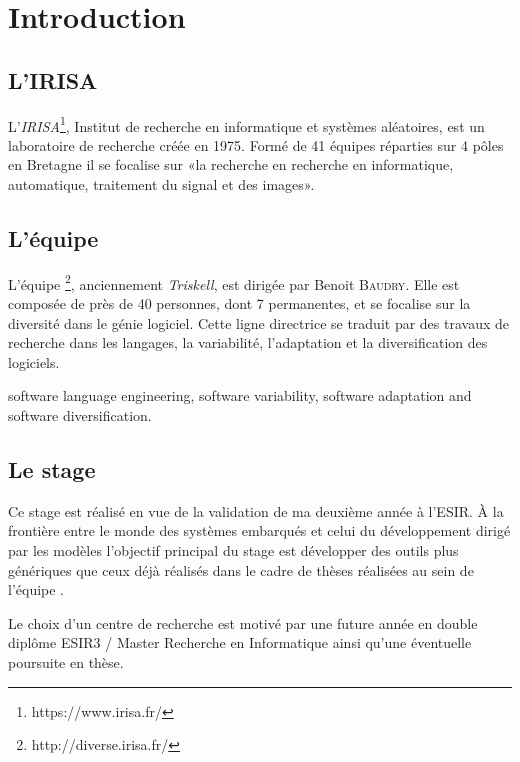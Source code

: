 \section*{Introduction} %
{}

\subsection{L'IRISA}

L'\emph{IRISA}\footnote{https://www.irisa.fr/}, Institut de recherche en informatique et systèmes aléatoires, est un laboratoire de recherche créée en 1975. Formé de 41 équipes réparties sur 4 pôles en Bretagne il se focalise sur «la recherche en recherche en informatique, automatique, traitement du signal et des images».

\subsection{L'équipe \diver}

L'équipe \diver\footnote{http://diverse.irisa.fr/}, anciennement \emph{Triskell}, est dirigée par Benoit \textsc{Baudry}. Elle est composée de près de 40 personnes, dont 7 permanentes, et se focalise sur la diversité dans le génie logiciel. Cette ligne directrice se traduit par des travaux de recherche dans les langages, la variabilité, l'adaptation et la diversification des logiciels.


 software language engineering, software variability, software adaptation and software diversification. 

\subsection{Le stage}
Ce stage est réalisé en vue de la validation de ma deuxième année à l'ESIR. À la frontière entre le monde des systèmes embarqués et celui du développement dirigé par les modèles l'objectif principal du stage est développer des outils plus génériques que ceux déjà réalisés dans le cadre de thèses réalisées au sein de l'équipe \diver.

Le choix d'un centre de recherche est motivé par une future année en double diplôme ESIR3 / Master Recherche en Informatique ainsi qu'une éventuelle poursuite en thèse.